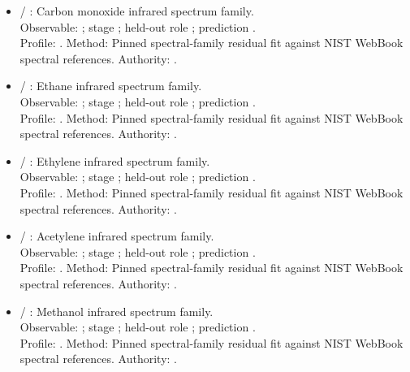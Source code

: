 \begin{itemize}
\item {} / : Carbon monoxide infrared spectrum family.\\ Observable: ; stage ; held-out role ; prediction .\\ Profile: . Method: Pinned spectral-family residual fit against NIST WebBook spectral references. Authority: .
\item {} / : Ethane infrared spectrum family.\\ Observable: ; stage ; held-out role ; prediction .\\ Profile: . Method: Pinned spectral-family residual fit against NIST WebBook spectral references. Authority: .
\item {} / : Ethylene infrared spectrum family.\\ Observable: ; stage ; held-out role ; prediction .\\ Profile: . Method: Pinned spectral-family residual fit against NIST WebBook spectral references. Authority: .
\item {} / : Acetylene infrared spectrum family.\\ Observable: ; stage ; held-out role ; prediction .\\ Profile: . Method: Pinned spectral-family residual fit against NIST WebBook spectral references. Authority: .
\item {} / : Methanol infrared spectrum family.\\ Observable: ; stage ; held-out role ; prediction .\\ Profile: . Method: Pinned spectral-family residual fit against NIST WebBook spectral references. Authority: .

\end{itemize}
